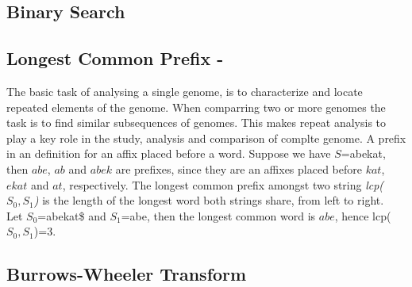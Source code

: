 \documentclass[12pt]{article} %
\begin{document}
\subsection{Binary Search} \label{Binary Search Section}

\subsection{Longest Common Prefix - } \label{LCPsection}

The basic task of analysing a single genome, is to characterize and locate repeated elements of the genome. When comparring two or more genomes the task is to find similar subsequences of genomes. This makes repeat analysis to play a key role in the study, analysis and comparison of complte genome. 
A prefix in an definition for an affix placed before a word. Suppose we have $S$=abekat, then $abe$, $ab$ and $abek$ are prefixes, since they are an affixes placed before $kat$, $ekat$ and $at$, respectively. The longest common prefix amongst two string \emph{lcp($S_0, S_1$)} is the length of the longest word both strings share, from left to right. \\
Let $S_0$=abekat\$ and $S_1$=abe, then the longest common word is $abe$, hence lcp($S_0, S_1$)=3.

\subsection{Burrows-Wheeler Transform} \label{Burrows-Wheeler Transform}
\end{document}
